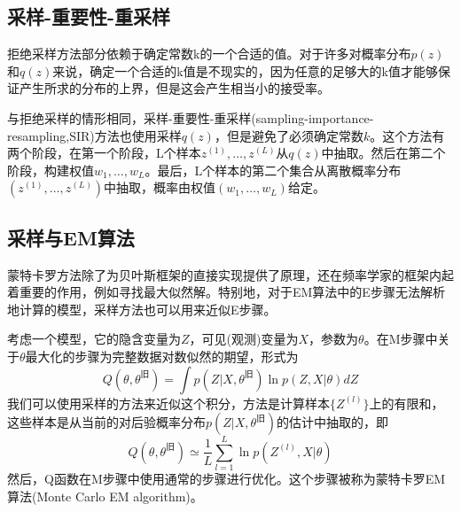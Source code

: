 \subsection*{采样-重要性-重采样}
拒绝采样方法部分依赖于确定常数k的一个合适的值。对于许多对概率分布$p(z)$和$q(z)$来说，确定一个合适的k值是不现实的，因为任意的足够大的k值才能够保证产生所求的分布的上界，但是这会产生相当小的接受率。

与拒绝采样的情形相同，采样-重要性-重采样(sampling-importance-resampling,SIR)方法也使用采样$q(z)$，但是避免了必须确定常数$k$。这个方法有两个阶段，在第一个阶段，L个样本$z^{(1)},\dots,z^{(L)}$从$q(z)$中抽取。然后在第二个阶段，构建权值$w_1,\dots,w_L$。最后，L个样本的第二个集合从离散概率分布$(z^{(1)},\dots,z^{(L)})$中抽取，概率由权值$(w_1,\dots,w_L)$给定。
\subsection*{采样与EM算法}
蒙特卡罗方法除了为贝叶斯框架的直接实现提供了原理，还在频率学家的框架内起着重要的作用，例如寻找最大似然解。特别地，对于EM算法中的E步骤无法解析地计算的模型，采样方法也可以用来近似E步骤。

考虑一个模型，它的隐含变量为$Z$，可见(观测)变量为$X$，参数为$\theta$。在M步骤中关于$\theta$最大化的步骤为完整数据对数似然的期望，形式为
\begin{equation}
	Q(\theta,\theta^{\text{旧}})=\int p(Z|X,\theta^{\text{旧}})\ln p(Z,X|\theta)dZ
\end{equation}
我们可以使用采样的方法来近似这个积分，方法是计算样本$\{Z^{(l)} \}$上的有限和，这些样本是从当前的对后验概率分布$p(Z|X,\theta^{\text{旧}})$的估计中抽取的，即
\begin{equation}
	Q(\theta,\theta^{\text{旧}})\simeq \frac{1}{L}\sum_{l=1}^{L}\ln p(Z^{(l)},X|\theta)
\end{equation}
然后，Q函数在M步骤中使用通常的步骤进行优化。这个步骤被称为蒙特卡罗EM算法(Monte Carlo EM algorithm)。

